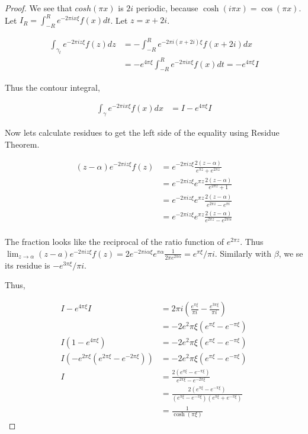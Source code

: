 \documentclass{article}
\begin{document}
\begin{proof}
    
    We see that $cosh(\pi x)$ is $2 i$ periodic, because $\cosh(i \pi x) = \cos(\pi x)$. Let $I_R = \int_{-R}^{R} e^{-2 \pi i x \xi} f(x)dt$. Let $z = x + 2i$. 
    
    \begin{align*}
        \int_{\gamma_t} e^{-2 \pi i z \xi} f(z) dz &= -\int_{-R}^{R} e^{-2 \pi i (x + 2i) \xi} f(x + 2i) dx \\
        &= -e^{4 \pi \xi} \int_{-R}^{R} e^{-2 \pi i x \xi} f(x)dt = -e^{4 \pi \xi} I
    \end{align*}

    Thus the contour integral, 

    \begin{align*}
        \int_{\gamma} e^{-2 \pi i x \xi} f(x) dx &= I -e^{4 \pi \xi} I
    \end{align*}

    Now lets calculate residues to get the left side of the equality using Residue Theorem. 

    \begin{align*}
        (z - \alpha) e^{-2 \pi i z \xi} f(z) &= e^{-2 \pi i z \xi} \frac{2(z - \alpha)}{e^{\pi z} + e^{2 \pi z}} \\
        &= e^{-2 \pi i z \xi} e^{\pi z}\frac{2(z - \alpha)}{e^{2\pi z} + 1} \\
        &= e^{-2 \pi i z \xi} e^{\pi z}\frac{2(z - \alpha)}{e^{2\pi z} - e^{\pi i}} \\
        &= e^{-2 \pi i z \xi} e^{\pi z}\frac{2(z - \alpha)}{e^{2\pi z} - e^{2\pi \alpha}} \\
    \end{align*}

    The fraction looks like the reciprocal of the ratio function of $e^{2 \pi z}$. Thus $\lim_{z \to \alpha} (z - a) e^{-2 \pi i z \xi} f(z) =  2e^{-2 \pi i \alpha \xi} e^{\pi \alpha} \frac{1}{2 \pi e^{2 \pi \alpha}} = e^{\pi \xi} / \pi i$. Similarly with $\beta$, we se its residue is $-e^{3\pi \xi} / \pi i$.  
    
    Thus, 

    \begin{align*}
        I -e^{4 \pi \xi} I &= 2\pi i \left(\frac{e^{ \pi \xi}}{\pi i} - \frac{e^{3\pi \xi}}{\pi i}\right) \\
        &= -2 e^2\pi \xi\left(e^{\pi \xi} - e^{-\pi \xi}\right) \\
        I(1 - e^{4 \pi \xi}) &= -2 e^2\pi \xi\left(e^{\pi \xi} - e^{-\pi \xi}\right) \\
        I(-e^{2\pi \xi}(e^{2 \pi \xi} - e^{-2 \pi \xi})) &= -2 e^2\pi \xi\left(e^{\pi \xi} - e^{-\pi \xi}\right) \\ 
        I &= \frac{2(e^{\pi \xi} - e^{- \pi \xi})}{e^{2 \pi \xi} - e^{-2 \pi \xi}} \\
        &= \frac{2(e^{\pi \xi} - e^{- \pi \xi})}{(e^{\pi \xi} - e^{- \pi \xi})(e^{\pi \xi} + e^{- \pi \xi})} \\
        &= \frac{1}{\cosh(\pi \xi)}
    \end{align*}


\end{proof}
\end{document}
